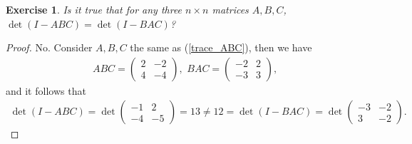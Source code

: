 \documentclass[11pt]{book}
\newtheorem{exercise}{Exercise}[section]
\theoremstyle{definition}
\numberwithin{equation}{subsection}
\begin{document}
\begin{exercise}
Is it true that for any three $n \times n$ matrices $A, B, C$, $\det (I - ABC) = \det (I - BAC)$?
\end{exercise}
\begin{proof}
No. Consider $A, B, C$ the same as (\ref{trace_ABC}), then we have
\begin{align*}
    ABC = \begin{pmatrix}
        2 & -2 \\
        4 & -4
    \end{pmatrix}, \,\, BAC = \begin{pmatrix}
        -2 & 2 \\
        -3 & 3
    \end{pmatrix},
\end{align*}
and it follows that
\begin{align*}
    \det (I - ABC) = \det \begin{pmatrix}
        -1 & 2 \\
        -4 & -5
    \end{pmatrix} = 13 \neq 12 = \det (I - BAC) = \det \begin{pmatrix}
        -3 & -2 \\
        3 & -2
    \end{pmatrix}.
\end{align*}
\end{proof}

\medskip
\end{document}
